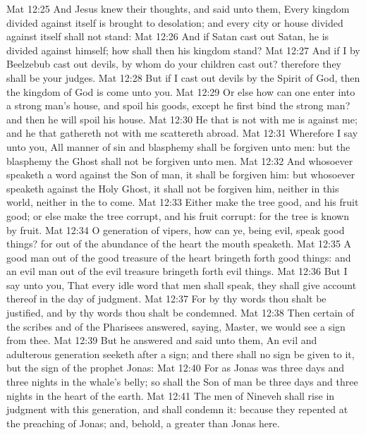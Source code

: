 \vs Mat 12:25 And Jesus knew their thoughts, and said unto them, Every kingdom divided against itself is brought to desolation; and every city or house divided against itself shall not stand:
\vs Mat 12:26 And if Satan cast out Satan, he is divided against himself; how shall then his kingdom stand?
\vs Mat 12:27 And if I by Beelzebub cast out devils, by whom do your children cast  out? therefore they shall be your judges.
\vs Mat 12:28 But if I cast out devils by the Spirit of God, then the kingdom of God is come unto you.
\vs Mat 12:29 Or else how can one enter into a strong man's house, and spoil his goods, except he first bind the strong man? and then he will spoil his house.
\vs Mat 12:30 He that is not with me is against me; and he that gathereth not with me scattereth abroad.
\vs Mat 12:31 Wherefore I say unto you, All manner of sin and blasphemy shall be forgiven unto men: but the blasphemy  the  Ghost shall not be forgiven unto men.
\vs Mat 12:32 And whosoever speaketh a word against the Son of man, it shall be forgiven him: but whosoever speaketh against the Holy Ghost, it shall not be forgiven him, neither in this world, neither in the  to come.
\vs Mat 12:33 Either make the tree good, and his fruit good; or else make the tree corrupt, and his fruit corrupt: for the tree is known by  fruit.
\vs Mat 12:34 O generation of vipers, how can ye, being evil, speak good things? for out of the abundance of the heart the mouth speaketh.
\vs Mat 12:35 A good man out of the good treasure of the heart bringeth forth good things: and an evil man out of the evil treasure bringeth forth evil things.
\vs Mat 12:36 But I say unto you, That every idle word that men shall speak, they shall give account thereof in the day of judgment.
\vs Mat 12:37 For by thy words thou shalt be justified, and by thy words thou shalt be condemned.
\vs Mat 12:38 Then certain of the scribes and of the Pharisees answered, saying, Master, we would see a sign from thee.
\vs Mat 12:39 But he answered and said unto them, An evil and adulterous generation seeketh after a sign; and there shall no sign be given to it, but the sign of the prophet Jonas:
\vs Mat 12:40 For as Jonas was three days and three nights in the whale's belly; so shall the Son of man be three days and three nights in the heart of the earth.
\vs Mat 12:41 The men of Nineveh shall rise in judgment with this generation, and shall condemn it: because they repented at the preaching of Jonas; and, behold, a greater than Jonas  here.
